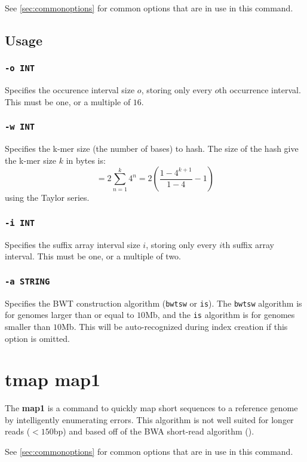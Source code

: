 \documentclass[a4paper,12pt]{book}
\newcommand{\TT}[1]{{\tt #1}} %
\newcommand{\BF}[1]{{\bf #1}} %
\begin{document}
See \autoref{sec:commonoptions} for common options that are in use in this command.

\subsection{Usage}

\subsubsection{\TT{-o INT}}
Specifies the occurence interval size $o$, storing only every $o$th occurrence interval.
This must be one, or a multiple of $16$.

\subsubsection{\TT{-w INT}}
Specifies the k-mer size (the number of bases) to hash.
The size of the hash give the k-mer size $k$ in bytes is:
\[
= 2 \sum_{n=1}^{k} 4^{n}
= 2 \left(\frac{1 - 4^{k+1}}{1-4} - 1\right)
\]
using the Taylor series.

\subsubsection{\TT{-i INT}}
Specifies the suffix array interval size $i$, storing only every $i$th suffix array interval.
This must be one, or a multiple of two.

\subsubsection{\TT{-a STRING}}
Specifies the BWT construction algorithm (\TT{bwtsw} or \TT{is}).
The \TT{bwtsw} algorithm is for genomes larger than or equal to $10$Mb, and the \TT{is} algorithm is for genomes smaller than $10$Mb.
This will be auto-recognized during index creation if this option is omitted.

\section{tmap map1}
\label{sec:map1}
The \BF{map1} is a command to quickly map short sequences to a reference genome by intelligently enumerating errors.
This algorithm is not well suited for longer reads ($<150$bp) and based off of the BWA short-read algorithm (\cite{BWA-short}).

See \autoref{sec:commonoptions} for common options that are in use in this command.
\end{document}
